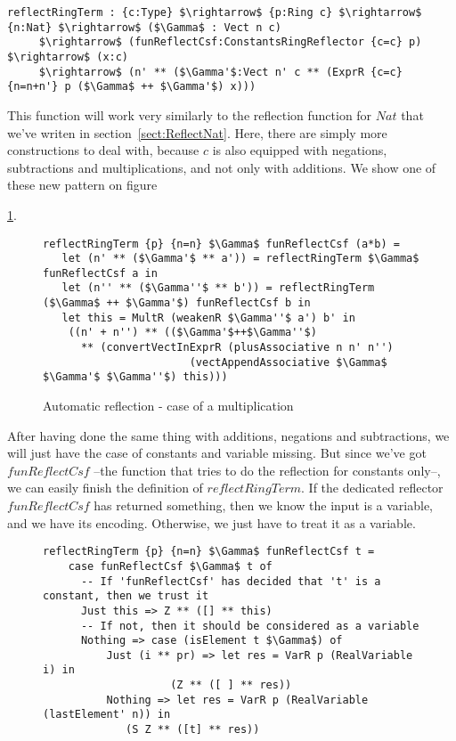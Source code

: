\begin{lstlisting}
reflectRingTerm : {c:Type} $\rightarrow$ {p:Ring c} $\rightarrow$ {n:Nat} $\rightarrow$ ($\Gamma$ : Vect n c) 
     $\rightarrow$ (funReflectCsf:ConstantsRingReflector {c=c} p) $\rightarrow$ (x:c) 
     $\rightarrow$ (n' ** ($\Gamma'$:Vect n' c ** (ExprR {c=c} {n=n+n'} p ($\Gamma$ ++ $\Gamma'$) x)))
\end{lstlisting}


This function will work very similarly to the reflection function for $Nat$ that we've writen in section~\ref{sect:ReflectNat}. Here, there are simply more constructions to deal with, because $c$ is also equipped with negations, subtractions and multiplications, and not only with additions. We show one of these new pattern on figure~{\ref{reflectRingTerm_pattern1}.

\begin{figure}[H]
\figrule
\begin{center}
\begin{lstlisting}
reflectRingTerm {p} {n=n} $\Gamma$ funReflectCsf (a*b) = 
   let (n' ** ($\Gamma'$ ** a')) = reflectRingTerm $\Gamma$ funReflectCsf a in
   let (n'' ** ($\Gamma''$ ** b')) = reflectRingTerm ($\Gamma$ ++ $\Gamma'$) funReflectCsf b in
   let this = MultR (weakenR $\Gamma''$ a') b' in
	((n' + n'') ** (($\Gamma'$++$\Gamma''$) 
	  ** (convertVectInExprR (plusAssociative n n' n'')
	                   (vectAppendAssociative $\Gamma$ $\Gamma'$ $\Gamma''$) this)))
\end{lstlisting}
\end{center}
\caption{Automatic reflection - case of a multiplication}
\label{reflectRingTerm_pattern1}
\figrule
\end{figure}

After having done the same thing with additions, negations and subtractions, we will just have the case of constants and variable missing. But since we've got $funReflectCsf$ --the function that tries to do the reflection for constants only--, we can easily finish the definition of $reflectRingTerm$. If the dedicated reflector $funReflectCsf$ has returned something, then we know the input is a variable, and we have its encoding. Otherwise, we just have to treat it as a variable.

\begin{figure}[H]
\figrule
\begin{center}
\begin{lstlisting}
reflectRingTerm {p} {n=n} $\Gamma$ funReflectCsf t =
    case funReflectCsf $\Gamma$ t of
      -- If 'funReflectCsf' has decided that 't' is a constant, then we trust it
      Just this => Z ** ([] ** this)
      -- If not, then it should be considered as a variable
      Nothing => case (isElement t $\Gamma$) of
          Just (i ** pr) => let res = VarR p (RealVariable i) in
			        (Z ** ([ ] ** res))
          Nothing => let res = VarR p (RealVariable (lastElement' n)) in
			 (S Z ** ([t] ** res))


\end{lstlisting}
\end{center}
\end{figure}}
